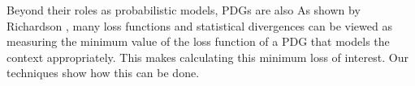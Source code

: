 \documentclass[twoside]{article}
\begin{document}
Beyond their roles as probabilistic models,
    PDGs are also 
As shown by Richardson
    ,
    many loss functions and statistical divergences
can be viewed as measuring the minimum value of the loss function 
of a PDG that models the context appropriately.
This makes calculating this minimum loss of interest.
Our techniques show how this can be done.
\end{document}

